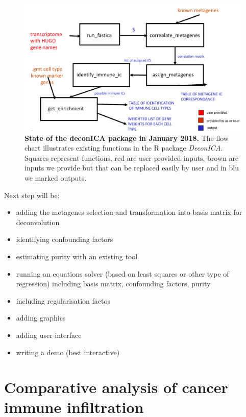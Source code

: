 \documentclass[12pt,]{book}
\providecommand{\tightlist}{%
  \setlength{\itemsep}{0pt}\setlength{\parskip}{0pt}}
\theoremstyle{definition}
\theoremstyle{definition}
\theoremstyle{definition}
\theoremstyle{remark}
\begin{document}
\begin{figure}

{\centering \includegraphics[width=1\linewidth]{figures-ext/deconICApipeline} 

}

\caption{\textbf{State of the deconICA package in
January 2018.} The flow chart illustrates existing functions in the R
package \emph{DeconICA}. Squares represent functions, red are
user-provided inputs, brown are inputs we provide but that can be
replaced easily by user and in blu we marked outputs.}\label{fig:deconICAflow}
\end{figure}







Next step will be:

\begin{itemize}
\tightlist
\item
  adding the metagenes selection and transformation into basis matrix
  for deconvolution
\item
  identifying confounding factors
\item
  estimating purity with an existing tool
\item
  running an equations solver (based on least squares or other type of
  regression) including basis matrix, confounding factors, purity
\item
  including regularisation factos
\item
  adding graphics
\item
  adding user interface
\item
  writing a demo (best interactive)
\end{itemize}

\hypertarget{results}{%
\chapter{Comparative analysis of cancer immune
infiltration}\label{results}}
\end{document}
